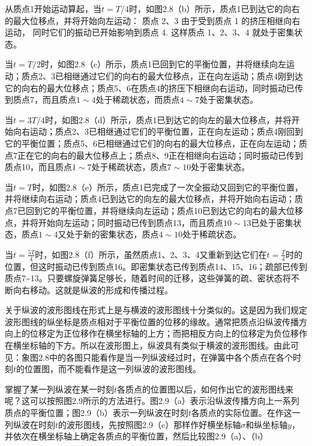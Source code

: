 从质点1开始运动算起，当\(t = T / 4\)时，如图2.8（b）所示，质点1已到达它的向右的最大位移点，并将开始向左运动：
质点 2、3 由于受到质点 1 的挤压相继向右运动，
同时它们的振动已开始影响到质点 4. 这样质点 1、2、3、4 就处于密集状态。

当\(t = T / 2\)时，如图2.8（c）所示，质点1已回到它的平衡位置，并将继续向左运动；质点2、3已相继通过它们的向右的最大位移点，正在向左运动；质点4刚到达它的向右的最大位移点；质点5、6在质点4的挤压下相继向右运动，同时振动已传到质点7，而且质点\(1\sim 4\)处于稀疏状态，而质点\(4\sim 7\)处于密集状态。

当\(t = 3T / 4\)时，如图2.8（d）所示，质点1已到达它的向左的最大位移点，并将开始向右运动；质点2、3已相继通过它们的平衡位置，正在向左运动；质点4刚回到它的平衡位置；质点5、6已相继通过它们的向右的最大位移点，正在向左运动；质点7正在它的向右的最大位移点上；质点8、9正在相继向右运动；同时振动已传到质点10，而且质点\(1\sim 7\)处于稀疏状态，质点\(7\sim 10\)处于密集状态。

当\(t = T\)时，如图2.8（e）所示，质点1已完成了一次全振动又回到它的平衡位置，并将继续向右运动；质点4已到达它的向左的最大位移点，并将开始向右运动；质点7已回到它的平衡位置，并将继续向左运动；质点10已到达它的向右的最大位移点，并将开始向左运动；同时振动已传到质点13，而且质点\(10\sim 13\)已处于密集状态，质点\(1\sim 4\)又处于新的密集状态，质点\(4\sim 10\)处于稀疏状态。

当\(t = \frac{5T}{4}\)时，如图2.8（f）所示，虽然质点1、2、3、4又重新到达它们在\(t = \frac{T}{4}\)时的位置，但这时振动已传到质点16。即密集状态已传到质点14、15、16；疏部已传到质点7\textasciitilde13。只要螺旋弹簧足够长，随着时间的迁移，这些弹簧的疏、密状态将不断向右移动。这就是纵波的形成和传播过程。

关于纵波的波形图线在形式上是与横波的波形图线十分类似的。这是因为我们规定波形图线的纵坐标是质点相对于平衡位置的位移的缘故。通常把质点沿纵波传播方向上的位移定为正位移作在横坐标轴的上方；而把相反方向上的位移定为负位移作在横坐标轴的下方。所以在波形图上，纵波具有类似于横波的波形图线。由此可见：象图2.8中的各图只能看作是当一列纵波经过时，在弹簧中各个质点在各个时刻\(t\)的位置图，而不能看作是这一列纵波的波形图线。

掌握了某一列纵波在某一时刻\(t\)各质点的位置图以后，如何作出它的波形图线来呢？这可以按照图2.9所示的方法进行。图2.9（a）表示沿纵波传播方向上一系列质点的平衡位置；图2.9（b）表示一列纵波在时刻\(t\)各质点的实际位置。在作这一列纵波在时刻\(t\)的波形图线，先按照图2.9（c）那样作好横坐标轴\(\sigma\)和纵坐标轴\(y\)，并依次在横坐标轴上确定各质点的平衡位置，然后比较图2.9（a）、（b）


